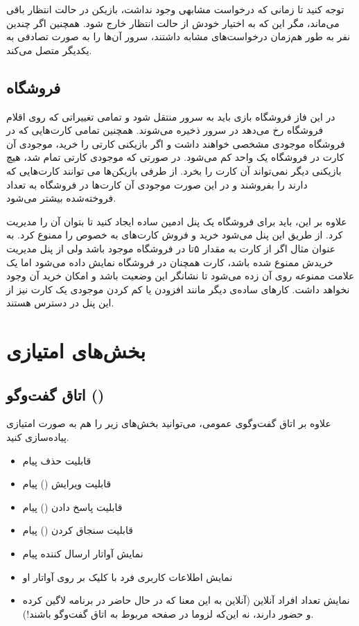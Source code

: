 \documentclass[]{article}
\begin{document}
توجه کنید تا زمانی که درخواست مشابهی وجود نداشت، بازیکن در حالت انتظار باقی می‌ماند، مگر این که به اختیار خودش از حالت انتظار خارج شود. همچنین اگر چندین نفر به طور هم‌زمان درخواست‌های مشابه داشتند، سرور آن‌ها را به صورت تصادفی به یکدیگر متصل می‌کند.

\subsection*{{\titr فروشگاه}}
در این فاز فروشگاه بازی باید به سرور منتقل شود و تمامی تغییراتی که روی اقلام فروشگاه رخ می‌دهد در سرور ذخیره می‌شوند. همچنین تمامی کارت‌هایی که در فروشگاه موجودی مشخصی خواهند داشت و اگر بازیکنی کارتی را خرید، موجودی آن کارت در فروشگاه یک واحد کم می‌شود. در صورتی که موجودی کارتی تمام شد، هیچ بازیکنی دیگر نمی‌تواند آن کارت را بخرد. از طرفی بازیکن‌ها می توانند کارت‌هایی که دارند را بفروشند و در این صورت موجودی آن کارت‌ها در فروشگاه به تعداد فروخته‌شده بیشتر می‌شود.

علاوه بر این، باید برای فروشگاه یک پنل ادمین ساده ایجاد کنید تا بتوان آن را مدیریت کرد. از طریق این پنل می‌شود خرید و فروش کارت‌های به خصوص را ممنوع کرد. به عنوان مثال اگر از کارت  به مقدار ۵تا در فروشگاه موجود باشد ولی از پنل مدیریت خریدش ممنوع شده باشد، کارت همچنان در فروشگاه نمایش داده می‌شود اما یک علامت ممنوعه روی آن زده می‌شود تا نشانگر این وضعیت باشد و امکان خرید آن وجود نخواهد داشت. کارهای ساده‌ی دیگر مانند افزودن یا کم کردن موجودی یک کارت نیز از این پنل در دسترس هستند.


\section*{{\titr بخش‌های امتیازی}}

\subsection*{{\titr اتاق گفت‌وگو ()}}

علاوه بر اتاق گفت‌و‌گوی عمومی، می‌توانید بخش‌های زیر را هم به صورت امتیازی پیاده‌سازی کنید.

\begin{itemize}
	\item قابلیت حذف پیام
	\item  قابلیت ویرایش () پیام
	\item قابلیت پاسخ دادن () پیام
	\item قابلیت سنجاق کردن () پیام
	\item نمایش آواتار ارسال کننده پیام
	\item نمایش اطلاعات کاربری فرد با کلیک بر روی آواتار او
	\item نمایش تعداد افراد آنلاین (آنلاین به این معنا که در حال حاضر در برنامه لاگین کرده و حضور دارند، نه این‌که لزوما در صفحه مربوط به اتاق گفت‌وگو باشند!).
\end{itemize}
\end{document}
